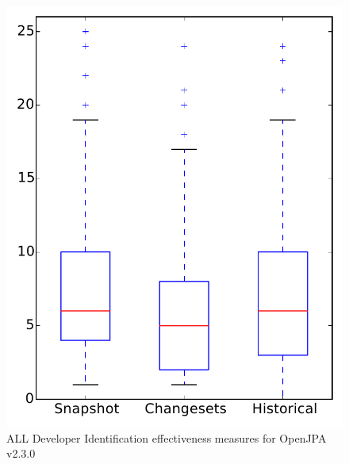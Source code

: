 
\begin{figure}
\centering
\includegraphics[height=0.4\textheight]{figures/dit/all_openjpa}
\caption{ALL Developer Identification effectiveness measures for OpenJPA v2.3.0}
\label{fig:dit:all:openjpa}
\end{figure}
